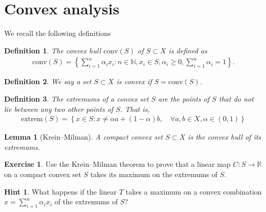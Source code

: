 \documentclass[
    a4paper,
    DIV=14,
    abstract=true,
    numbers=noenddot
]
{scrartcl}
\newtheorem{lemma}[lemma]{Lemma}
\newtheorem{definition}[definition]{Definition}
\theoremstyle{definition}
\newtheorem{exercise}{Exercise}
\newtheorem*{hint}{Hint}
\newcommand{\set}[1]{\left\{#1\right\}}
\newcommand{\rmm}[1]{\mathrm{#1}}
\newcommand{\N}{\mathbb{N}}
\newcommand{\R}{\mathbb{R}}
\begin{document}
\section{Convex analysis}
We recall the following definitions
\begin{definition}
    The convex hull $\rmm{conv}(S)$ of $S \subset X$ is defined as
    \begin{align*}
        \rmm{conv}(S) = \set{\sum_{i=1}^n \alpha_i x_i : n \in \N,  x_i \in S,\alpha_i \geq 0, \sum_{i=1}^n \alpha_i=1}.
    \end{align*}
\end{definition}
\begin{definition}
    We say a set $S \subset X$ is convex if $S = \rmm{conv}(S)$.
\end{definition}
\begin{definition}
    The extremums of a convex set $S$ are the points of $S$ that do not lie between any two other points of $S$. That is,
    \begin{align*}
        \rmm{extrem}(S) = \set{ x \in S: x \neq \alpha a + (1-\alpha)b , \quad\forall a,b \in X, \alpha \in (0,1)}
    \end{align*}

\end{definition}
\begin{lemma}[{Krein--Milman}] A compact convex set $S \subset X$  is the convex hull of its extremums.
\end{lemma}
\begin{exercise}\label{max exercise}
    Use the Krein--Milman theorem to prove that a linear map $C: S \to \R$  on a compact convex set $S$ takes its maximum on the extremums of $S$.
\end{exercise}
\begin{hint}
    What happens if the linear $T$ takes a maximum on a convex combination $x = \sum_{i=1}^n \alpha_i x_i$ of the extremums of $S$?
\end{hint}
\end{document}
